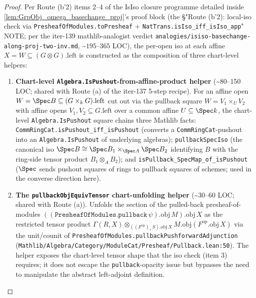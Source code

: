 \begin{proof}
  
  Per Route (b'2) items 2--4 of the IsIso closure programme detailed inside \cref{lem:GrpObj_omega_basechange_proj}'s proof block (the \S "Route (b'2): local-iso check via \texttt{PresheafOfModules.toPresheaf} + \texttt{NatTrans.isIso\_iff\_isIso\_app}" NOTE; per the iter-139 mathlib-analogist verdict \texttt{analogies/isiso-basechange-along-proj-two-inv.md}, \textasciitilde\(195\)--\(365\) LOC), the per-open iso at each affine \(X = W \subseteq (G \otimes G).\mathrm{left}\) is constructed as the composition of three chart-level helpers:
  \begin{enumerate}
    \item \textbf{Chart-level \texttt{Algebra.IsPushout}-from-affine-product helper} (\textasciitilde\(80\)--\(150\) LOC; shared with Route (a) of the iter-137 5-step recipe). For an affine open \(W = \Spec B \subseteq (G \times_{k} G).\mathrm{left}\) cut out via the pullback square \(W = V_{1} \times_{U} V_{2}\) with affine opens \(V_{1}, V_{2} \subseteq G.\mathrm{left}\) over a common affine \(U \subseteq \Spec k\), the chart-level \texttt{Algebra.IsPushout} square chains three Mathlib facts: \texttt{CommRingCat.isPushout\_iff\_isPushout} (converts a \texttt{CommRingCat}-pushout into an \texttt{Algebra.IsPushout} of underlying algebras); \texttt{pullbackSpecIso} (the canonical iso \(\Spec B \cong \Spec B_{1} \times_{\Spec A} \Spec B_{2}\) identifying \(B\) with the ring-side tensor product \(B_{1} \otimes_{A} B_{2}\)); and \texttt{isPullback\_SpecMap\_of\_isPushout} (\(\Spec\) sends pushout squares of rings to pullback squares of schemes; used in the converse direction here).
    \item \textbf{The \texttt{pullbackObjEquivTensor} chart-unfolding helper} (\textasciitilde\(30\)--\(60\) LOC; shared with Route (a)). Unfolds the section of the pulled-back presheaf-of-modules \(((\texttt{PresheafOfModules.pullback}\,\psi).\mathrm{obj}\,M).\mathrm{obj}\,X\) as the restricted tensor product \(\Gamma(R, X) \otimes_{((F^{\mathrm{op}})_{*}\,S).\mathrm{obj}\,X} M.\mathrm{obj}(F^{\mathrm{op}}.\mathrm{obj}\,X)\) via the unit/counit of \texttt{PresheafOfModules.pullbackPushforwardAdjunction} (\texttt{Mathlib/Algebra/Category/ModuleCat/Presheaf/Pullback.lean:50}). The helper exposes the chart-level tensor shape that the iso check (item 3) requires; it does not escape the \texttt{pullback}-opacity issue but bypasses the need to manipulate the abstract left-adjoint definition.

\end{enumerate}
\end{proof}
